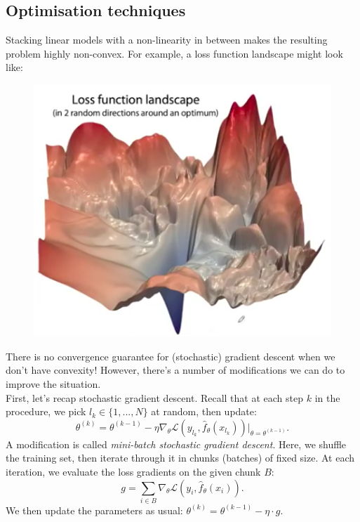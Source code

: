 \minirule

\subsection{Optimisation techniques}
Stacking linear models with a non-linearity in between makes the resulting problem highly non-convex. For example, a loss function landscape might look like:
\begin{figure}[H]
\centering
\includegraphics[scale=0.4]{lossfunctionlandscape.png}
\end{figure}
There is no convergence guarantee for (stochastic) gradient descent when we don't have convexity! However, there's a number of modifications we can do to improve the situation.\\

First, let's recap stochastic gradient descent. Recall that at each step $k$ in the procedure, we pick $l_k \in \{1,...,N\}$ at random, then update:
\begin{equation*}
\theta^{(k)} = \theta^{(k-1)} - \eta \nabla_{\theta} \mathcal{L}(y_{l_k}, \hat{f}_{\theta}(x_{l_k})) \bigg|_{\theta = \theta^{(k-1)}}.
\end{equation*}
A modification is called \textit{mini-batch stochastic gradient descent}. Here, we shuffle the training set, then iterate through it in chunks (batches) of fixed size. At each iteration, we evaluate the loss gradients on the given chunk $B$:
\begin{equation*}
g = \sum_{i\in B} \nabla_{\theta} \mathcal{L}(y_i, \hat{f}_{\theta}(x_i)).
\end{equation*}
We then update the parameters as usual: $\theta^{(k)} = \theta^{(k-1)} - \eta \cdot g$. \\

